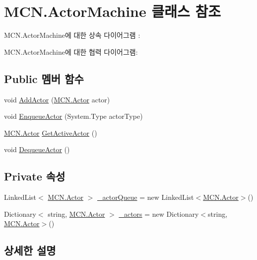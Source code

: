 \hypertarget{class_m_c_n_1_1_actor_machine}{}\section{M\+C\+N.\+Actor\+Machine 클래스 참조}
\label{class_m_c_n_1_1_actor_machine}


M\+C\+N.\+Actor\+Machine에 대한 상속 다이어그램 \+: 


M\+C\+N.\+Actor\+Machine에 대한 협력 다이어그램\+:
\subsection*{Public 멤버 함수}
\begin{DoxyCompactItemize}
\item 
void \hyperlink{class_m_c_n_1_1_actor_machine_a64284549a56ecf35cb0679101aa9ab11}{Add\+Actor} (\hyperlink{class_m_c_n_1_1_actor}{M\+C\+N.\+Actor} actor)
\item 
void \hyperlink{class_m_c_n_1_1_actor_machine_a2762339a4d7f2a872f53076a3491ed03}{Enqueue\+Actor} (System.\+Type actor\+Type)
\item 
\hyperlink{class_m_c_n_1_1_actor}{M\+C\+N.\+Actor} \hyperlink{class_m_c_n_1_1_actor_machine_a7b3687c57ed3e48db2aaa77fc02d766c}{Get\+Active\+Actor} ()
\item 
void \hyperlink{class_m_c_n_1_1_actor_machine_a845c5d834f618606d2e6561eae4b11b1}{Dequeue\+Actor} ()
\end{DoxyCompactItemize}
\subsection*{Private 속성}
\begin{DoxyCompactItemize}
\item 
Linked\+List$<$ \hyperlink{class_m_c_n_1_1_actor}{M\+C\+N.\+Actor} $>$ \hyperlink{class_m_c_n_1_1_actor_machine_a9e02068493541237f3f6fb8a6141bbc4}{\+\_\+actor\+Queue} = new Linked\+List$<$\hyperlink{class_m_c_n_1_1_actor}{M\+C\+N.\+Actor}$>$()
\item 
Dictionary$<$ string, \hyperlink{class_m_c_n_1_1_actor}{M\+C\+N.\+Actor} $>$ \hyperlink{class_m_c_n_1_1_actor_machine_a4e38488fdd2af93cc62e2b8fd6d4dc2c}{\+\_\+actors} = new Dictionary$<$string, \hyperlink{class_m_c_n_1_1_actor}{M\+C\+N.\+Actor}$>$()
\end{DoxyCompactItemize}


\subsection{상세한 설명}


